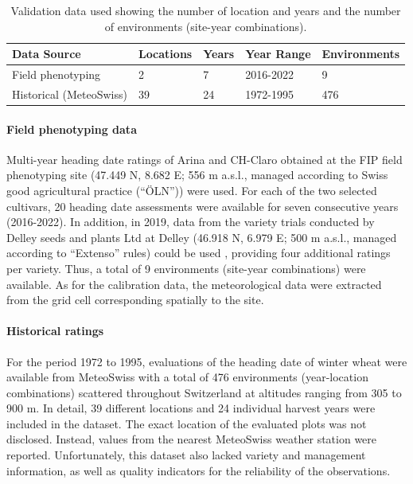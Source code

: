 \begin{table}[H]
\caption{Validation data used showing the number of location and years and the number of environments (site-year combinations).}
\centering
\label{tab:val-data}
\begin{tabular}{@{}lllll@{}}
\toprule
\textbf{Data Source}  & \textbf{Locations} & \textbf{Years} & \textbf{Year Range} & \textbf{Environments}   \\ \midrule
Field phenotyping    & 2        & 7    & 2016-2022 & 9 \\
Historical (MeteoSwiss) & 39        & 24    & 1972-1995  & 476  \\ \bottomrule
\end{tabular}
\end{table}

\paragraph{Field phenotyping data}
Multi-year heading date ratings of Arina and CH-Claro obtained at the FIP field phenotyping site \citep{kirchgessner_eth_2017} (47.449 N, 8.682 E; 556 m a.s.l., managed according to Swiss good agricultural practice (``ÖLN'')) were used. For each of the two selected cultivars, 20 heading date assessments were available for seven consecutive years (2016-2022). In addition, in 2019, data from the variety trials conducted by Delley seeds and plants Ltd at Delley (46.918 N, 6.979 E; 500 m a.s.l., managed according to ``Extenso'' rules) could be used \citep{roth_image-based_2023}, providing four additional ratings per variety. Thus, a total of 9 environments (site-year combinations) were available. As for the calibration data, the meteorological data were extracted from the grid cell corresponding spatially to the site.

\paragraph{Historical ratings}
For the period 1972 to 1995, evaluations of the heading date of winter wheat were available from MeteoSwiss with a total of 476 environments (year-location combinations) scattered throughout Switzerland at altitudes ranging from 305 to 900 m. In detail, 39 different locations and 24 individual harvest years were included in the dataset. The exact location of the evaluated plots was not disclosed. Instead, values from the nearest MeteoSwiss weather station were reported. Unfortunately, this dataset also lacked variety and management information, as well as quality indicators for the reliability of the observations.

